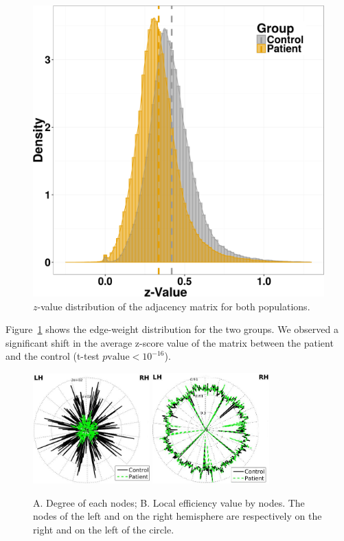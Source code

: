 \begin{figure}
\centering
\includegraphics[width=1.0\textwidth]{images/schizo/schizo_fig_1.png}
\caption{$z$-value distribution of the adjacency matrix for both populations.}
\label{fig:ttest_schizo}
\end{figure}

Figure~\ref{fig:ttest_schizo} shows the edge-weight distribution for the two groups.
We observed a significant shift in the average z-score value of the matrix between the patient and the control (t-test $p\textrm{value} < 10^{-16}$).

\begin{figure}
\centering
\includegraphics[width=0.4\textwidth]{images/schizo/schizo_fig_2a.jpg}
\includegraphics[width=0.4\textwidth]{images/schizo/schizo_fig_2b.jpg}
\caption{A. Degree of each nodes; B. Local efficiency value by nodes. The nodes of the left and on the right hemisphere are respectively on the right and on the left of the circle.}
\label{fig:schizo_degree}
\end{figure}

